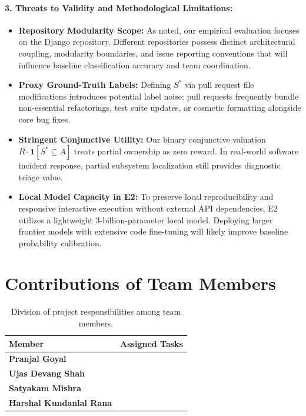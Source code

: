 \documentclass{article}
\theoremstyle{definition}
\newcommand{\indicator}{\mathbf{1}}
\begin{document}
\paragraph{3. Threats to Validity and Methodological Limitations:}
\begin{itemize}
    \item \textbf{Repository Modularity Scope:} As noted, our empirical evaluation focuses on the Django repository. Different repositories possess distinct architectural coupling, modularity boundaries, and issue reporting conventions that will influence baseline classification accuracy and team coordination.
    \item \textbf{Proxy Ground-Truth Labels:} Defining $S^*$ via pull request file modifications introduces potential label noise: pull requests frequently bundle non-essential refactorings, test suite updates, or cosmetic formatting alongside core bug fixes.
    \item \textbf{Stringent Conjunctive Utility:} Our binary conjunctive valuation $R \cdot \indicator[S^* \subseteq A]$ treats partial ownership as zero reward. In real-world software incident response, partial subsystem localization still provides diagnostic triage value.
    \item \textbf{Local Model Capacity in E2:} To preserve local reproducibility and responsive interactive execution without external API dependencies, E2 utilizes a lightweight 3-billion-parameter local model. Deploying larger frontier models with extensive code fine-tuning will likely improve baseline probability calibration.
\end{itemize}

\section{Contributions of Team Members}
\label{sec:contributions}

\begin{table}[h]
\centering
\renewcommand{\arraystretch}{1.25}
\begin{tabular}{p{} p{}}
\hline
\textbf{Member} & \textbf{Assigned Tasks} \\
\hline

\textbf{Pranjal Goyal}
&

\\

\textbf{Ujas Devang Shah}
&

\\

\textbf{Satyakam Mishra}
&

\\

\textbf{Harshal Kundanlal Rana}
&

\\

\hline
\end{tabular}
\caption{Division of project responsibilities among team members.}
\label{tab:team-contributions}
\end{table}
\end{document}
